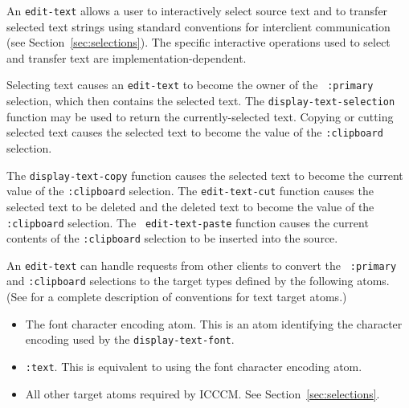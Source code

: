 An {\tt edit-text} 
allows a user to interactively select source text and to transfer
selected text strings using standard conventions for interclient communication  (see
Section~\ref{sec:selections}).  The specific interactive operations used to
select and transfer text are implementation-dependent.

Selecting text causes an {\tt edit-text} to become the owner of the {\tt
:primary} selection, which then contains the selected text. 
The {\tt display-text-selection} function may be used to return the
currently-selected text.
Copying or cutting selected text causes the selected text to become
the value of the {\tt :clipboard} selection.

The {\tt display-text-copy} function causes the selected text to become the
current value of the {\tt :clipboard} selection.
The {\tt edit-text-cut} function causes the selected text to be deleted and the
deleted text to become the value of the {\tt :clipboard}
selection. The {\tt
edit-text-paste} function causes the current contents of the {\tt :clipboard}
selection to be inserted into the source.

An {\tt edit-text} can handle requests from other clients to convert the {\tt
:primary} and {\tt :clipboard} selections to the target types defined by the
following atoms. (See \cite{icccm} for a
complete description of conventions for text target atoms.)

\begin{itemize}
\item The font character encoding atom. This is an atom identifying the character
encoding used by the {\tt display-text-font}. 
\item {\tt :text}. This is equivalent to using the font character encoding
atom. 
\item All other target atoms required by ICCCM. See Section~\ref{sec:selections}.
\end{itemize}




